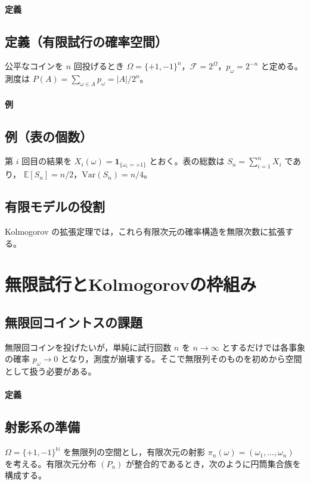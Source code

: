 \documentclass[uplatex,dvipdfmx,11pt,a4paper,openany]{bxjsbook}
\begin{document}
\paragraph{定義}
\subsection{定義（有限試行の確率空間）}
公平なコインを \(n\) 回投げるとき
                    \(\Omega=\{+1,-1\}^n\)，\(\mathcal{F}=2^\Omega\)，\(p_\omega=2^{-n}\) と定める。測度は
                    \(P(A)=\sum_{\omega\in A}p_\omega=|A|/2^n\)。


\paragraph{例}
\subsection{例（表の個数）}
第 \(i\) 回目の結果を
                    \(X_i(\omega)=\mathbf{1}_{\{\omega_i=+1\}}\) とおく。表の総数は \(S_n=\sum_{i=1}^n X_i\) であり，
                    \(\mathbb{E}[S_n]=n/2\)，\(\mathrm{Var}(S_n)=n/4\)。


\subsection{有限モデルの役割}
Kolmogorov の拡張定理では，これら有限次元の確率構造を無限次数に拡張する。

\section{無限試行とKolmogorovの枠組み}
\subsection{無限回コイントスの課題}
無限回コインを投げたいが，単純に試行回数 \(n\) を \(n \to \infty\) とするだけでは各事象の確率
                    \(p_\omega \to 0\) となり，測度が崩壊する。そこで無限列そのものを初めから空間として扱う必要がある。

\paragraph{定義}
\subsection{射影系の準備}
\(\Omega = \{+1,-1\}^{\mathbb{N}}\) を無限列の空間とし，有限次元の射影 \(\pi_n(\omega) = (\omega_1,\ldots,\omega_n)\)
                    を考える。有限次元分布 \((P_n)\) が整合的であるとき，次のように円筒集合族を構成する。
\end{document}
